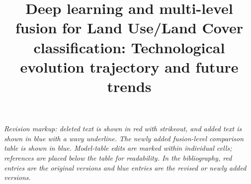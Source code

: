 \documentclass[]{interact}
\theoremstyle{plain}%
\theoremstyle{definition}
\theoremstyle{remark}
\DeclareRobustCommand{\DIFadd}[1]{{\protect\color{DIFaddcolor}\uwave{#1}}}
\DeclareRobustCommand{\DIFdel}[1]{{\protect\color{DIFdelcolor}\sout{#1}}}
\def\DIFadd#1{#1}%
\def\DIFdel#1{}%
\begin{document}
\linenumbers


\title{Deep learning and multi-level fusion for \DIFdel{land-use} \DIFdel{and} \DIFdel{land-cover} \DIFadd{Land} \DIFadd{Use}\DIFadd{/}\DIFadd{Land} \DIFadd{Cover} classification: Technological evolution trajectory and future trends}

\author{
}

\maketitle

\noindent\footnotesize\textit{Revision markup: deleted text is shown in red with strikeout, and added text is shown in blue with a wavy underline. The newly added fusion-level comparison table is shown in blue. Model-table edits are marked within individual cells; references are placed below the table for readability. In the bibliography, red entries are the original versions and blue entries are the revised or newly added versions.}\normalsize\par\medskip
\end{document}
